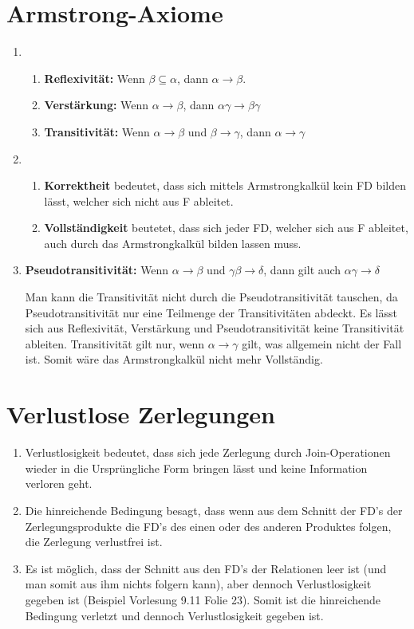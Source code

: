\documentclass{scrartcl}
\begin{document}
\maketitle
\section{Armstrong-Axiome}
\begin{enumerate}
\item
    \begin{enumerate}
    \item \textbf{Reflexivität:} Wenn $\beta \subseteq \alpha$, dann $\alpha \to \beta$.
    \item \textbf{Verstärkung:} Wenn $\alpha \to \beta$, dann $\alpha \gamma \to \beta \gamma $
    \item \textbf{Transitivität:} Wenn $\alpha \to \beta$ und $\beta \to \gamma$, dann $\alpha \to \gamma$
    \end{enumerate}
\item 
    \begin{enumerate}
    \item \textbf{Korrektheit} bedeutet, dass sich mittels Armstrongkalkül kein FD bilden lässt, welcher sich nicht aus F ableitet.
    \item \textbf{Vollständigkeit} beutetet, dass sich jeder FD, welcher sich aus F ableitet, auch durch das Armstrongkalkül bilden lassen muss.
    \end{enumerate}
\item
    \textbf{Pseudotransitivität:} Wenn $\alpha \to \beta$ und $\gamma \beta \to \delta$, dann gilt auch $\alpha \gamma \to \delta$
    
    Man kann die Transitivität nicht durch die Pseudotransitivität tauschen, da Pseudotransitivität nur eine Teilmenge der Transitivitäten abdeckt. Es lässt sich aus Reflexivität, Verstärkung und Pseudotransitivität keine Transitivität ableiten. Transitivität gilt nur, wenn $\alpha \to \gamma$ gilt, was allgemein nicht der Fall ist. Somit wäre das Armstrongkalkül nicht mehr Vollständig.
\end{enumerate}
\section{Verlustlose Zerlegungen}
\begin{enumerate}
    \item Verlustlosigkeit bedeutet, dass sich jede Zerlegung durch Join-Operationen wieder in die Ursprüngliche Form bringen lässt und keine Information verloren geht.
    \item Die hinreichende Bedingung besagt, dass wenn aus dem Schnitt der FD's der Zerlegungsprodukte die FD's des einen oder des anderen Produktes folgen, die Zerlegung verlustfrei ist.
    \item Es ist möglich, dass der Schnitt aus den FD's der Relationen leer ist (und man somit aus ihm nichts folgern kann), aber dennoch Verlustlosigkeit gegeben ist (Beispiel Vorlesung 9.11 Folie 23). Somit ist die hinreichende Bedingung verletzt und dennoch Verlustlosigkeit gegeben ist.
\end{enumerate}
\end{document}
